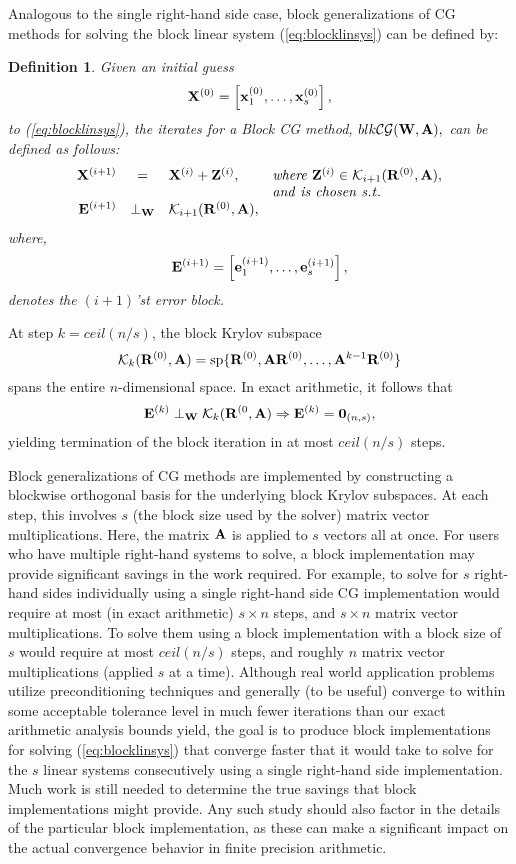 \documentclass{article}
\newtheorem{defn}{Definition}[section]
\newcommand{\bA}{{\bf A}}
\newcommand{\bE}{{\bf E}}
\newcommand{\bR}{{\bf R}}
\newcommand{\bW}{{\bf W}}
\newcommand{\bX}{{\bf X}}
\newcommand{\bZ}{{\bf Z}}
\newcommand{\bx}{{\bf x}}
\newcommand{\be}{{\bf e}}
\newcommand{\dm}{\begin{displaymath}}
\newcommand{\edm}{\end{displaymath}}
\newcommand{\eq}{\begin{equation}}
\newcommand{\eeq}{\end{equation}}
\begin{document}
Analogous to the single right-hand side case, block
generalizations of CG methods for solving the block linear system
(\ref{eq:blocklinsys}) can be defined by:

 \begin{defn} \label{def:blkcgmethod}
 {Given an initial guess
  \dm
  \bX^{(0)} = \left[ \bx_1^{(0)}, \ldots, \bx_s^{(0)} \right],
  \edm
 to (\ref{eq:blocklinsys}), the iterates for a Block CG method, $blk{\cal CG}(\bW,\bA),$
 can be defined as follows:
 \eq
 \begin{array}{rcll}
 \bX^{(i+1)} &=& \bX^{(i)} + \bZ^{(i)}, \quad & {\it where}~ \bZ^{(i)} \in {\cal
 K}_{i+1}(\bR^{(0)},\bA), \\
 ~&~&~& {\it and~is~chosen~s.t.} \\
  \bE^{(i+1)} & \perp_{\bW} & {\cal K}_{i+1} (\bR^{(0)}, \bA), &~
 \end{array}
 \label{eq:blk_iterates}
  \eeq
 where,
  \dm
   \bE^{(i+1)} = \left[ \be_{1}^{(i+1)}, \ldots, \be_{s}^{(i+1)}
   \right],
   \edm
denotes the $(i+1)$'st error block. }
\end{defn}
\vspace{0.1in}

At step $k = ceil(n/s)$, the block Krylov subspace
 \dm
 {\cal K}_{k}(\bR^{(0)},\bA) = {\rm sp}\{\bR^{(0)},\bA \bR^{(0)},\ldots,\bA^{k-1}\bR^{(0)}\}
 \edm
spans the entire $n$-dimensional space. In exact arithmetic, it
follows that
 \dm
 \bE^{(k)} \perp_{\bW} {\cal K}_k (\bR^{(0}, \bA) \Rightarrow
 \bE^{(k)} = {\bf 0}_{(n,s)},
 \edm
yielding termination of the block iteration in at most $ceil(n/s)$
steps.

Block generalizations of CG methods are implemented by
constructing a blockwise orthogonal basis for the underlying block
Krylov subspaces. At each step, this involves $s$ (the block size
used by the solver) matrix vector multiplications. Here, the
matrix $\bA$ is applied to $s$ vectors all at once. For users who
have multiple right-hand systems to solve, a block implementation
may provide significant savings in the work required. For example,
to solve for $s$ right-hand sides individually using a single
right-hand side CG implementation would require at most (in exact
arithmetic) $s \times n$ steps, and $s \times n$ matrix vector
multiplications. To solve them using a block implementation with a
block size of $s$ would require at most $ceil(n/s)$ steps, and
roughly $n$ matrix vector multiplications (applied $s$ at a time).
Although real world application problems utilize preconditioning
techniques and generally (to be useful) converge to within some
acceptable tolerance level in much fewer iterations than our exact
arithmetic analysis bounds yield, the goal is to produce block
implementations for solving (\ref{eq:blocklinsys}) that converge
faster that it would take to solve for the $s$ linear systems
consecutively using a single right-hand side implementation. Much
work is still needed to determine the true savings that block
implementations might provide. Any such study should also factor
in the details of the particular block implementation, as these
can make a significant impact on the actual convergence behavior
in finite precision arithmetic.
\end{document}
